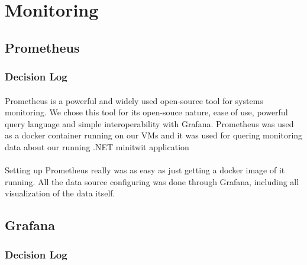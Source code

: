 \section{Monitoring}
\subsection{Prometheus}

\subsubsection{Decision Log}
\paragraph{} Prometheus is a powerful and widely used open-source tool for systems monitoring. We chose this tool for its open-souce nature, ease of use, powerful query language and simple interoperability with Grafana. Prometheus was used as a docker container running on our VMs and it was used for quering monitoring data about our running .NET minitwit application
\paragraph{} Setting up Prometheus really was as easy as just getting a docker image of it running. All the data source configuring was done through Grafana, including all visualization of the data itself.

\subsection{Grafana}
\subsubsection{Decision Log}
